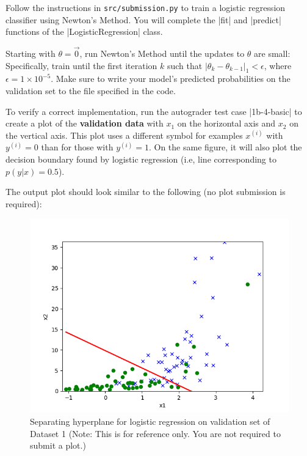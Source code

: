 \item {}
Follow the instructions in \texttt{src/submission.py} to train a logistic regression classifier using Newton's Method. You will complete the |fit| and |predict| functions of the |LogisticRegression| class.

Starting with $\theta = \vec{0}$, run Newton's Method until the updates to $\theta$ are small: Specifically,  train until the first iteration $k$ such that $\vert\theta_{k} - \theta_{k-1}\vert_1 < \epsilon$, where $\epsilon = 1\times 10^{-5}$. Make sure to write your model's predicted probabilities on the validation set to the file specified in the code.

To verify a correct implementation, run the autograder test case |1b-4-basic| to create a plot of the \textbf{validation data} with $x_1$ on the horizontal axis and $x_2$ on the vertical axis. This plot uses a different symbol for examples $x^{(i)}$ with $y^{(i)} = 0$ than for those with $y^{(i)} = 1$. On the same figure, it will also plot the decision boundary found by logistic regression (i.e, line corresponding to $p(y\vert x) = 0.5$).

The output plot should look similar to the following (no plot submission is required): 

\begin{figure}[H]
	\centering
	\vspace{2mm}
	\includegraphics[width=0.65\linewidth]{01-linearclass/p01b_pred_1.png}
    \caption{Separating hyperplane for logistic regression on validation set of Dataset 1 (Note: This is for reference only.  You are not required to submit a plot.)}
\end{figure}

